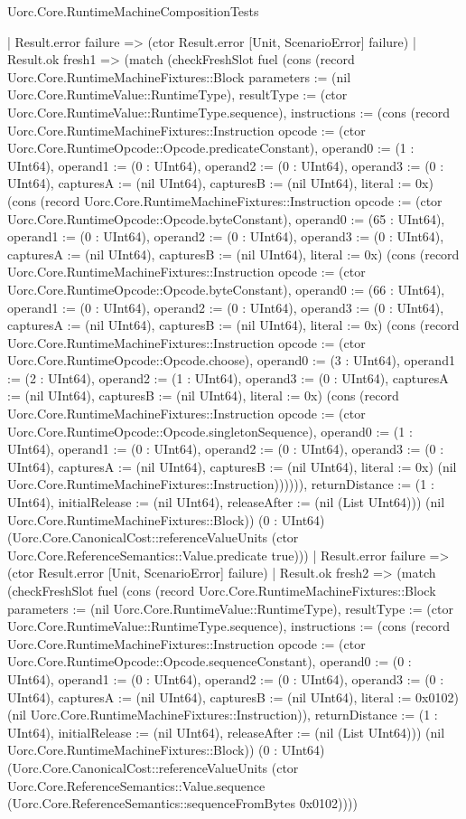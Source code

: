 \begin{lexlean}{Uorc.Core.RuntimeMachineCompositionTests}
\begin{semanticmodule}
{      | Result.error failure => (ctor Result.error [Unit, ScenarioError] failure)
      | Result.ok fresh1 => (match (checkFreshSlot fuel (cons (record Uorc.Core.RuntimeMachineFixtures::Block {parameters := (nil Uorc.Core.RuntimeValue::RuntimeType), resultType := (ctor Uorc.Core.RuntimeValue::RuntimeType.sequence), instructions := (cons (record Uorc.Core.RuntimeMachineFixtures::Instruction {opcode := (ctor Uorc.Core.RuntimeOpcode::Opcode.predicateConstant), operand0 := (1 : UInt64), operand1 := (0 : UInt64), operand2 := (0 : UInt64), operand3 := (0 : UInt64), capturesA := (nil UInt64), capturesB := (nil UInt64), literal := 0x}) (cons (record Uorc.Core.RuntimeMachineFixtures::Instruction {opcode := (ctor Uorc.Core.RuntimeOpcode::Opcode.byteConstant), operand0 := (65 : UInt64), operand1 := (0 : UInt64), operand2 := (0 : UInt64), operand3 := (0 : UInt64), capturesA := (nil UInt64), capturesB := (nil UInt64), literal := 0x}) (cons (record Uorc.Core.RuntimeMachineFixtures::Instruction {opcode := (ctor Uorc.Core.RuntimeOpcode::Opcode.byteConstant), operand0 := (66 : UInt64), operand1 := (0 : UInt64), operand2 := (0 : UInt64), operand3 := (0 : UInt64), capturesA := (nil UInt64), capturesB := (nil UInt64), literal := 0x}) (cons (record Uorc.Core.RuntimeMachineFixtures::Instruction {opcode := (ctor Uorc.Core.RuntimeOpcode::Opcode.choose), operand0 := (3 : UInt64), operand1 := (2 : UInt64), operand2 := (1 : UInt64), operand3 := (0 : UInt64), capturesA := (nil UInt64), capturesB := (nil UInt64), literal := 0x}) (cons (record Uorc.Core.RuntimeMachineFixtures::Instruction {opcode := (ctor Uorc.Core.RuntimeOpcode::Opcode.singletonSequence), operand0 := (1 : UInt64), operand1 := (0 : UInt64), operand2 := (0 : UInt64), operand3 := (0 : UInt64), capturesA := (nil UInt64), capturesB := (nil UInt64), literal := 0x}) (nil Uorc.Core.RuntimeMachineFixtures::Instruction)))))), returnDistance := (1 : UInt64), initialRelease := (nil UInt64), releaseAfter := (nil (List UInt64))}) (nil Uorc.Core.RuntimeMachineFixtures::Block)) (0 : UInt64) (Uorc.Core.CanonicalCost::referenceValueUnits (ctor Uorc.Core.ReferenceSemantics::Value.predicate true)))
        | Result.error failure => (ctor Result.error [Unit, ScenarioError] failure)
        | Result.ok fresh2 => (match (checkFreshSlot fuel (cons (record Uorc.Core.RuntimeMachineFixtures::Block {parameters := (nil Uorc.Core.RuntimeValue::RuntimeType), resultType := (ctor Uorc.Core.RuntimeValue::RuntimeType.sequence), instructions := (cons (record Uorc.Core.RuntimeMachineFixtures::Instruction {opcode := (ctor Uorc.Core.RuntimeOpcode::Opcode.sequenceConstant), operand0 := (0 : UInt64), operand1 := (0 : UInt64), operand2 := (0 : UInt64), operand3 := (0 : UInt64), capturesA := (nil UInt64), capturesB := (nil UInt64), literal := 0x0102}) (nil Uorc.Core.RuntimeMachineFixtures::Instruction)), returnDistance := (1 : UInt64), initialRelease := (nil UInt64), releaseAfter := (nil (List UInt64))}) (nil Uorc.Core.RuntimeMachineFixtures::Block)) (0 : UInt64) (Uorc.Core.CanonicalCost::referenceValueUnits (ctor Uorc.Core.ReferenceSemantics::Value.sequence (Uorc.Core.ReferenceSemantics::sequenceFromBytes 0x0102))))
}
\end{semanticmodule}
\end{lexlean}
